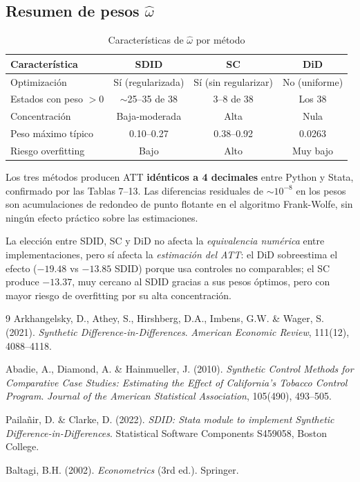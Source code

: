 \documentclass[11pt, a4paper]{article}
\begin{document}
\subsection{Resumen de pesos $\hat{\omega}$}

\begin{table}[H]
\centering
\caption{Características de $\hat{\omega}$ por método}
\begin{tabular}{lccc}
\toprule
\textbf{Característica} & \textbf{SDID} & \textbf{SC} & \textbf{DiD} \\
\midrule
Optimización & Sí (regularizada) & Sí (sin regularizar) & No (uniforme) \\
Estados con peso $>0$ & $\sim$25--35 de 38 & 3--8 de 38 & Los 38 \\
Concentración & Baja-moderada & Alta & Nula \\
Peso máximo típico & 0.10--0.27 & 0.38--0.92 & 0.0263 \\
Riesgo overfitting & Bajo & Alto & Muy bajo \\
\bottomrule
\end{tabular}
\end{table}

\begin{resultado}
Los tres métodos producen ATT \textbf{idénticos a 4 decimales} entre Python y Stata,
confirma\-do por las Tablas 7--13. Las diferencias residuales de $\sim10^{-8}$ en los
pesos son acumulaciones de redondeo de punto flotante en el algoritmo Frank-Wolfe,
sin ningún efecto práctico sobre las estimaciones.

\medskip
La elección entre SDID, SC y DiD no afecta la \textit{equivalencia numérica}
entre implementaciones, pero sí afecta la \textit{estimación del ATT}:
el DiD sobreestima el efecto ($-19.48$ vs $-13.85$ SDID) porque usa controles
no comparables; el SC produce $-13.37$, muy cercano al SDID gracias a sus
pesos óptimos, pero con mayor riesgo de overfitting por su alta concentración.
\end{resultado}

\newpage
\begin{thebibliography}{9}
Arkhangelsky, D., Athey, S., Hirshberg, D.A., Imbens, G.W. \& Wager, S. (2021).
\textit{Synthetic Difference-in-Differences}.
\textit{American Economic Review}, 111(12), 4088--4118.

Abadie, A., Diamond, A. \& Hainmueller, J. (2010).
\textit{Synthetic Control Methods for Comparative Case Studies:
Estimating the Effect of California's Tobacco Control Program}.
\textit{Journal of the American Statistical Association}, 105(490), 493--505.

Pailañir, D. \& Clarke, D. (2022).
\textit{SDID: Stata module to implement Synthetic Difference-in-Differences}.
Statistical Software Components S459058, Boston College.

Baltagi, B.H. (2002).
\textit{Econometrics} (3rd ed.). Springer.
\end{thebibliography}
\end{document}

